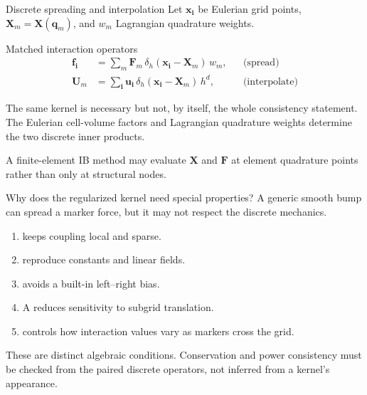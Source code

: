 \documentclass[aspectratio=169,11pt]{beamer}
\newcommand{\xvec}{\bm{x}}
\newcommand{\Xvec}{\bm{q}}
\newcommand{\chivec}{\bm{X}}
\newcommand{\uvec}{\bm{u}}
\newcommand{\Uvec}{\bm{U}}
\newcommand{\fvec}{\bm{f}}
\newcommand{\Fvec}{\bm{F}}
\begin{document}
\begin{frame}{Discrete spreading and interpolation}
Let \(\xvec_{\bm{i}}\) be Eulerian grid points, \(\chivec_m=\chivec(\Xvec_m)\), and \(w_m\) Lagrangian quadrature weights.

\begin{block}{Matched interaction operators}
\begin{align*}
  \fvec_{\bm{i}}
  &=\sum_m \Fvec_m\,
  \delta_h(\xvec_{\bm{i}}-\chivec_m)\,w_m,
  &&\text{(spread)}\\[2mm]
  \Uvec_m
  &=\sum_{\bm{i}} \uvec_{\bm{i}}\,
  \delta_h(\xvec_{\bm{i}}-\chivec_m)\,h^d,
  &&\text{(interpolate)}
\end{align*}
\end{block}

\begin{punchbox}
The same kernel is necessary but not, by itself, the whole consistency statement. The Eulerian cell-volume factors and Lagrangian quadrature weights determine the two discrete inner products.
\end{punchbox}
\vspace{3pt}
\small A finite-element IB method may evaluate \(\chivec\) and \(\Fvec\) at element quadrature points rather than only at structural nodes.
\end{frame}

\begin{frame}{Why does the regularized kernel need special properties?}
A generic smooth bump can spread a marker force, but it may not respect the discrete mechanics.

\begin{enumerate}\itemsep6pt
  \item {} keeps coupling local and sparse.
  \item {} reproduce constants and linear fields.
  \item {} avoids a built-in left--right bias.
  \item A  reduces sensitivity to subgrid translation.
  \item {} controls how interaction values vary as markers cross the grid.
\end{enumerate}

\begin{punchbox}
These are distinct algebraic conditions. Conservation and power consistency must be checked from the paired discrete operators, not inferred from a kernel's appearance.
\end{punchbox}
\end{frame}
\end{document}
